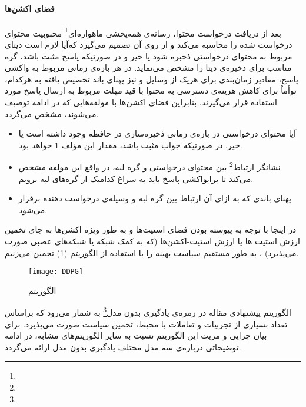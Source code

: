 \paragraph{فضای اکشن‌ها}
بعد از دریافت درخواست محتوا، رسانه‌ی همه‌پخشی ماهواره‌ای\footnote{} محبوبیت محتوای درخواست شده را محاسبه می‌کند و از روی آن تصمیم می‌گیرد که‌آیا لازم است دیتای مربوط به محتوای درخواستی ذخبره شود یا خیر و در صورتیکه پاسخ مثبت باشد،‌ گره مناسب برای ذخیره‌ی دیتا را مشخص می‌نماید. در هر بازه‌ی زمانی مربوط به واکشی پاسخ، مقادیر زمان‌بندی برای هریک از وسایل و نیز پهنای باند تخصیص یافته به هرکدام، توأماً برای کاهش هزینه‌ی دسترسی به محتوا با قید مهلت مربوط به ارسال پاسخ مورد استفاده قرار می‌گیرند. بنابراین فضای اکشن‌ها با مولفه‌هایی که در ادامه توصیف می‌شوند، مشخص می‌گردد.
\begin{itemize}
	\item 
	آیا محتوای درخواستی در بازه‌ی زمانی ذخیره‌سازی در حافظه وجود داشته است یا خیر. در صورتیکه جواب مثبت باشد، مقدار این مؤلف 1 خواهد بود.  
	\item 
	نشانگر ارتباط\footnote{} بین محتوای درخواستی و گره لبه، در واقع این مولفه مشخص می‌کند تا برایواکشی پاسخ باید به سراغ کدامیک از گره‌های لبه برویم.
	\item
	پهنای باندی که به ازای آن ارتباط بین گره لبه و وسیله‌ی درخواست دهنده برقرار می‌شود.
\end{itemize}
 
 در اینجا با توجه به پیوسته بودن فضای استیت‌ها و به طور ویژه اکشن‌ها به جای تخمین ارزش استیت ها یا ارزش استیت‌-اکشن‌ها (که به کمک شبکه یا شبکه‌ها‌ی عصبی صورت می‌پذیرد) ، به طور مستقیم سیاست بهینه را با استفاده از الگوریتم (\ref{fig:DDPG}) تخمین می‌زنیم.
 \begin{figure}[ht]
 	\centerline{\texttt{[image: DDPG]}}
 	\caption{الگوریتم }
 	\label{fig:DDPG}
 \end{figure}

الگوریتم پیشنهادی مقاله در زمره‌ی یادگیری بدون مدل\footnote{} به‌ شمار می‌رود که براساس تعداد بسیاری از تجربیات و تعاملات با محیط، تخمین سیاست صورت می‌پذیرد. برای بیان چرایی و مزیت این الگوریتم نسبت به سایر الگوریتم‌های مشابه، در ادامه توضیحاتی درباره‌ی سه مدل مختلف یادگیری بدون مدل ارائه می‌گردد. 

